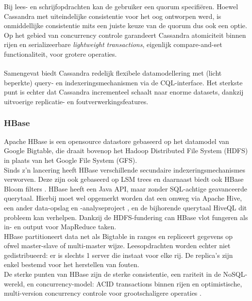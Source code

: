 Bij lees- en schrijfopdrachten kan de gebruiker een quorum specifi\"eren. Hoewel Cassandra met uiteindelijke consistentie voor het oog ontworpen werd, is onmiddellijke consistentie mits een juiste keuze van de quorum dus ook een optie.\\
Op het gebied van concurrency controle garandeert Cassandra atomiciteit binnen rijen en serializeerbare \textit{lightweight transactions}, eigenlijk compare-and-set functionaliteit, voor grotere operaties.
\\\\
Samengevat biedt Cassandra redelijk flexibele datamodellering met (licht beperkte) query- en indexeringsmechanismen via de CQL-interface. Het sterkste punt is echter dat Cassandra incrementeel schaalt naar enorme datasets, dankzij uitvoerige replicatie- en foutverwerkingsfeatures.

\subsubsection{HBase}

Apache HBase is een opensource datastore gebaseerd op het datamodel van Google Bigtable, die draait bovenop het Hadoop Distributed File System (HDFS) in plaats van het Google File System (GFS).\\
Sinds z'n lancering heeft HBase verschillende secundaire indexeringsmechanismes verworven. Deze zijn ook gebaseerd op LSM trees en daarnaast biedt ook HBase Bloom filters \cite{borthakur2011apache}\cite{hbase_schema}. HBase heeft een Java API, maar zonder SQL-achtige geavanceerde querytaal. Hierbij moet wel opgemerkt worden dat een omweg via Apache Hive, een ander data-opslag en -analyseproject \cite{apache_hive}, en de bijhorende querytaal HiveQL dit probleem kan verhelpen. Dankzij de HDFS-fundering can HBase vlot fungeren als in- en output voor MapReduce taken.\\
HBase partitioneert data net als Bigtable in ranges en repliceert gegevens op ofwel master-slave of multi-master wijze. Leesopdrachten worden echter niet gedistribueerd: er is slechts 1 server die instaat voor elke rij. De replica's zijn enkel bestemd voor het herstellen van fouten.\\
De sterke punten van HBase zijn de sterke consistentie, een rariteit in de NoSQL-wereld, en concurrency-model: ACID transactions binnen rijen en optimistische, multi-version concurrency controle voor grootschaligere operaties \cite{hbase_acid}\cite{grolinger2013data}\cite{borthakur2011apache}.\\

